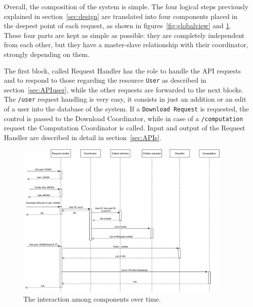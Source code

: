 Overall, the composition of the system is simple. The four logical steps previously explained in section~\ref{sec:design} are translated into four components placed in the deepest point of each request, as shown in figures~\ref{fig:globalview} and \ref{fig:interaction}. These four parts are kept as simple as possible: they are completely independent from each other, but they have a master-slave relationship with their coordinator, strongly depending on them.

The first block, called Request Handler has the role to handle the API requests and to respond to those regarding the resource \texttt{User} as described in section~\ref{sec:APIuser}, while the other requests are forwarded to the next blocks. The \texttt{/user} request handling is very easy, it consists in just an addition or an edit of a user into the database of the system. If a \texttt{Download Request} is requested, the control is passed to the Download Coordinator, while in case of a \texttt{/computation} request the Computation Coordinator is called. Input and output of the Request Handler are described in detail in section~\ref{sec:APIs}.

\begin{figure}
\centering
\includegraphics[width=%
0.95\textwidth]{img/interaction}
\caption{The interaction among components over time.}
\label{fig:interaction}
\end{figure}

